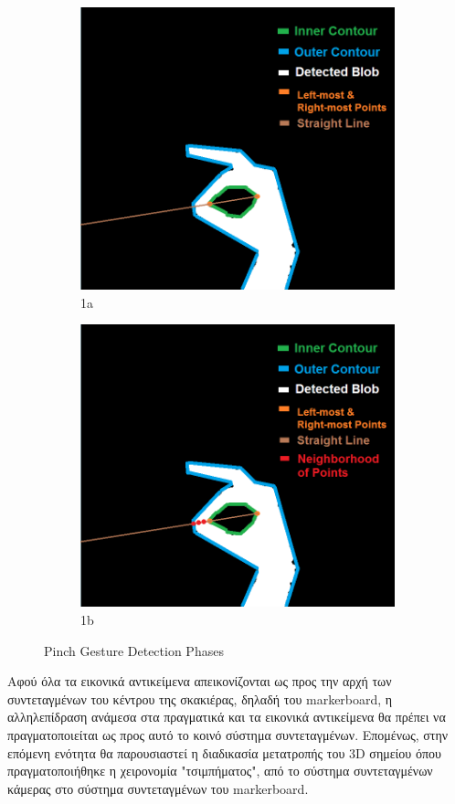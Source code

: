 \begin{figure}
\begin{subfigure}{.5\textwidth}
  \includegraphics[width=.8\linewidth]{Files/Figures/4.png}
  \caption{1a}
  \label{fig:sfig1}
\end{subfigure}%
\begin{subfigure}{.5\textwidth}
  \centering
  \includegraphics[width=.8\linewidth]{Files/Figures/5.png}
  \caption{1b}
  \label{fig:sfig2}
\end{subfigure}
\caption{Pinch Gesture Detection Phases}
\label{fig:fig}
\end{figure}



Αφού όλα τα εικονικά αντικείμενα απεικονίζονται ως προς την αρχή των συντεταγμένων του κέντρου της σκακιέρας, δηλαδή του markerboard, η αλληλεπίδραση ανάμεσα στα πραγματικά και τα εικονικά αντικείμενα θα πρέπει να πραγματοποιείται ως προς αυτό το κοινό σύστημα συντεταγμένων. Επομένως, στην επόμενη ενότητα θα παρουσιαστεί η διαδικασία μετατροπής του 3D σημείου όπου πραγματοποιήθηκε η χειρονομία "τσιμπήματος", από το σύστημα συντεταγμένων κάμερας στο σύστημα συντεταγμένων του markerboard.



